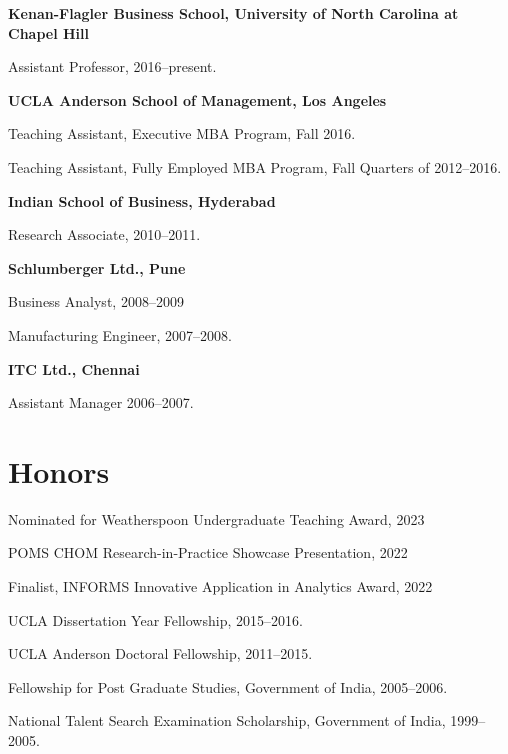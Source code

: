 \documentclass[11pt,a4paper]{article}
\renewenvironment{itemize}{
	\begin{list}{}{
			\setlength{\leftmargin}{1.5em}
		}
	}{
\end{list}
}
\begin{document}
	\begin{itemize}
		\item \textbf{Kenan-Flagler Business School, University of North Carolina at Chapel Hill}

		\begin{itemize}
			\item Assistant Professor, 2016--present.
		\end{itemize}
		\item \textbf{UCLA Anderson School of Management, Los Angeles}

		\begin{itemize}
			\item Teaching Assistant, Executive MBA Program, Fall 2016.
			\item Teaching Assistant, Fully Employed MBA Program, Fall Quarters of 2012--2016.
		\end{itemize}

		\item \textbf{Indian School of Business, Hyderabad}

		\begin{itemize}
			\item Research Associate, 2010--2011.
		\end{itemize}


		\item \textbf{Schlumberger Ltd., Pune}
		\begin{itemize}
			\item Business Analyst,  2008--2009
			\item Manufacturing Engineer, 2007--2008.
		\end{itemize}
		\item \textbf{ITC Ltd., Chennai}

		\begin{itemize}
			\item Assistant Manager 2006--2007.
		\end{itemize}

	\end{itemize}

	\section*{\textbf{Honors}}

	\begin{itemize}
		\item Nominated for Weatherspoon Undergraduate Teaching Award, 2023
		\item POMS CHOM Research-in-Practice Showcase Presentation, 2022
		\item Finalist, INFORMS Innovative Application in Analytics Award, 2022
		\item UCLA Dissertation Year Fellowship, 2015--2016.
		\item UCLA Anderson Doctoral Fellowship, 2011--2015.
		\item Fellowship for Post Graduate Studies, Government of India,  2005--2006.
		\item National Talent Search Examination Scholarship, Government of India, 1999--2005.
	\end{itemize}
\end{document}
